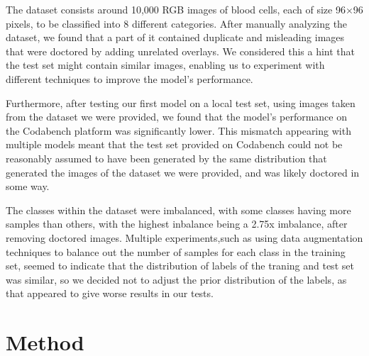 \documentclass[11pt]{article}
\begin{document}
\begin{multicols}{2}

      The dataset consists around 10,000 RGB images of blood cells, each
      of size 96\(\times\)96 pixels, to be classified into 8 different
      categories. After manually analyzing the dataset, we found that
      a part of it contained duplicate and misleading images that were doctored
      by adding unrelated overlays. We considered this a hint that the test set
      might contain similar images, enabling us to experiment with different
      techniques to improve the model's performance.

      Furthermore, after testing our first model on a local test set, using images
      taken from the dataset we were provided, we found that the model's 
      performance on the Codabench platform was significantly lower. This mismatch
      appearing with multiple models meant that the test set provided on Codabench
      could not be reasonably assumed to have been generated by the same distribution
      that generated the images of the dataset we were provided, and was likely
      doctored in some way.

      The classes within the dataset were imbalanced, with some classes having
      more samples than others, with the highest inbalance being a 2.75x imbalance,
      after removing doctored images. Multiple experiments,such as using data 
      augmentation techniques to balance out the number of samples for each class 
      in the training set, seemed to indicate that the distribution of labels of 
      the traning and test set was similar, so we decided not to adjust the prior 
      distribution of the labels, as that appeared to give worse results in our tests.

      \section{Method}


\end{multicols}
\end{document}
